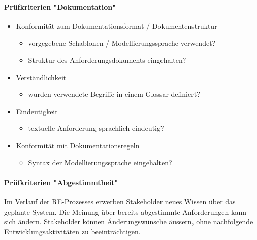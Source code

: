 \documentclass[a4paper]{article}
\begin{document}
				\paragraph{Prüfkriterien "Dokumentation"}
				
				\begin{itemize}
					\item Konformität zum Dokumentationsformat / Dokumentenstruktur
						\begin{itemize}
							\item vorgegebene Schablonen / Modellierungssprache verwendet?
							\item Struktur des Anforderungsdokuments eingehalten?
						\end{itemize}
					\item Verständlichkeit
						\begin{itemize}
							\item wurden verwendete Begriffe in einem Glossar definiert?			
						\end{itemize}
					\item Eindeutigkeit
						\begin{itemize}
							\item textuelle Anforderung sprachlich eindeutig?
						\end{itemize}
					\item Konformität mit Dokumentationsregeln
						\begin{itemize}
							\item Syntax der Modellierungssprache eingehalten?
						\end{itemize}
				\end{itemize}
			
				\paragraph{Prüfkriterien "Abgestimmtheit"}
				
				Im Verlauf der RE-Prozesses erwerben Stakeholder neues Wissen über das geplante System.
				Die Meinung über bereits abgestimmte Anforderungen kann sich ändern.
				Stakeholder können Änderungswünsche äussern, ohne nachfolgende Entwicklungsaktivitäten zu beeinträchtigen.
				
\end{document}
